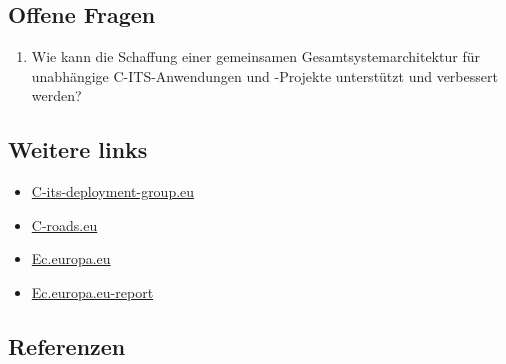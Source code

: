 \documentclass[
]{book}
\providecommand{\tightlist}{%
  \setlength{\itemsep}{0pt}\setlength{\parskip}{0pt}}
\begin{document}
\hypertarget{offene-fragen-12}{%
\subsection*{Offene Fragen}\label{offene-fragen-12}}

\begin{enumerate}
\def\labelenumi{\arabic{enumi}.}
\tightlist
\item
  Wie kann die Schaffung einer gemeinsamen Gesamtsystemarchitektur für unabhängige C-ITS-Anwendungen und -Projekte unterstützt und verbessert werden?
\end{enumerate}

\hypertarget{weitere-links-10}{%
\subsection*{Weitere links}\label{weitere-links-10}}

\begin{itemize}
\tightlist
\item
  \href{https://c-its-deployment-group.eu/knowledge-base/publications/}{C-its-deployment-group.eu}
\item
  \href{https://www.c-roads.eu/platform/documents.html}{C-roads.eu}
\item
  \href{https://ec.europa.eu/transport/themes/its/c-its_en}{Ec.europa.eu}
\item
  \href{https://ec.europa.eu/transport/sites/default/files/2016-c-its-deployment-study-final-report.pdf}{Ec.europa.eu-report}
\end{itemize}

\hypertarget{referenzen-12}{%
\subsection*{Referenzen}\label{referenzen-12}}
\end{document}

